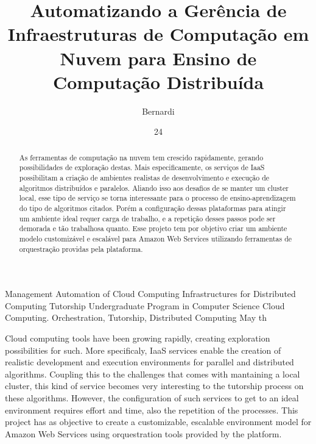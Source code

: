 \documentclass[tg]{mdtufsm}
\title{Automatizando a Gerência de Infraestruturas de Computação em Nuvem para Ensino de Computação Distribuída}
\author{Bernardi}{Cezar Augusto Contini}
\institute{Centro de Tecnologia}
\date{24}{Maio}{2016}
\begin{document}
\maketitle



\begin{abstract}
As ferramentas de computação na nuvem tem crescido rapidamente, gerando possibilidades de exploração destas. Mais especificamente, os serviços de IaaS possibilitam a criação de ambientes realistas de desenvolvimento e execução de algoritmos distribuídos e paralelos. Aliando isso aos desafios de se manter um cluster local, esse tipo de serviço se torna interessante para o processo de ensino-aprendizagem do tipo de algoritmos citados. Porém a configuração dessas plataformas para atingir um ambiente ideal requer carga de trabalho, e a repetição desses passos pode ser demorada e tão trabalhosa quanto. Esse projeto tem por objetivo criar um ambiente modelo customizável e escalável para Amazon Web Services utilizando ferramentas de orquestração providas pela plataforma.

\end{abstract}

\begin{englishabstract}
	{Management Automation of Cloud Computing Infrastructures for Distributed Computing Tutorship}
	{Undergraduate Program in Computer Science}
	{Cloud Computing. Orchestration, Tutorship, Distributed Computing}
	{May}
	{th}
	
Cloud computing tools have been growing rapidly, creating exploration possibilities for such. More specificaly, IaaS services enable the creation of realistic development and execution environments for parallel and distributed algorithms. Coupling this to the challenges that comes with mantaining a local cluster, this kind of service becomes very interesting to the tutorship process on these algorithms. However, the configuration of such services to get to an ideal environment requires effort and time, also the repetition of the processes. This project has as objective to create a customizable, escalable environment model for Amazon Web Services using orquestration tools provided by the platform.
	
\end{englishabstract}
\end{document}
